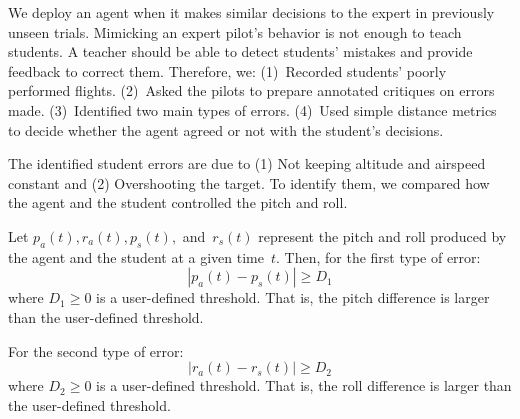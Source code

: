\documentclass[letterpaper]{article} %
\newcommand{\MET}[1]{\textcolor{blue}{MET: #1}}
\begin{document}
We deploy an agent when it makes similar decisions to the expert in previously unseen trials. Mimicking an expert pilot's behavior is not enough to teach students. A teacher should be able to detect students' mistakes and provide feedback to correct them. Therefore, we: (1)~Recorded students' poorly performed flights. (2)~Asked the pilots to prepare annotated critiques on errors made. (3)~Identified two main types of errors. (4)~Used simple distance metrics to decide whether the agent agreed or not with the student's decisions.

The identified student errors are due to (1) Not keeping altitude and airspeed constant and (2) Overshooting the target. To identify them, we compared how the agent and the student controlled the pitch and roll.

Let $p_a(t), r_a(t), p_s(t),$ and~$r_s(t)$ represent the pitch and roll produced by the agent and the student at a given time~$t$. Then, for the first type of error:
\begin{equation}
  |p_a(t) - p_s(t)| \ge D_1
  \label{eq_error1}
\end{equation}
where $D_1 \ge 0$ is a user-defined threshold. That is, the pitch difference is larger than the user-defined threshold.

For the second type of error:
\begin{equation}
    |r_a(t) - r_s(t)| \ge D_2
    \label{eq_error2}
\end{equation}
where $D_2 \ge 0$ is a user-defined threshold. That is, the roll difference is larger than the user-defined threshold.
\end{document}
